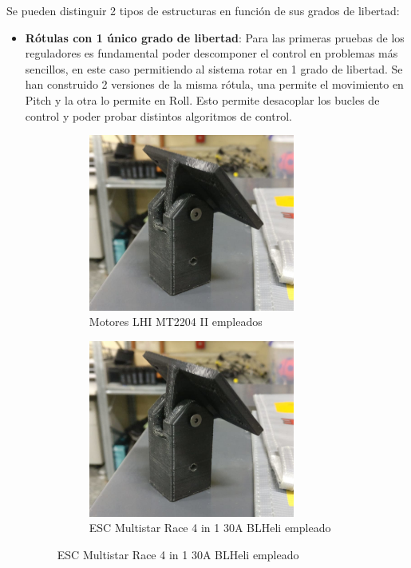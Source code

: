 Se pueden distinguir 2 tipos de estructuras en función de sus grados de libertad:

\begin{itemize}
	\item \textbf{Rótulas con 1 único grado de libertad}: Para las primeras pruebas de los reguladores es fundamental poder descomponer el control en problemas más sencillos, en este caso permitiendo al sistema rotar en 1 grado de libertad. Se han construido 2 versiones de la misma rótula, una permite el movimiento en Pitch y la otra lo permite en Roll. Esto permite desacoplar los bucles de control y poder probar distintos algoritmos de control.
	
	
	\begin{figure}[htb!]
		\centering
		\begin{subfigure}{0.4\textwidth}
			\centering
			\includegraphics[width=0.8\textwidth,height=0.2\textheight]{hardware/rotulaPitch1.jpeg}
			\caption{Motores LHI MT2204 II empleados}
			\label{a}
		\end{subfigure}
		\begin{subfigure}{0.4\textwidth}
			\centering
			\includegraphics[width=0.8\textwidth,height=0.2\textheight]{hardware/rotulaPitch1.jpeg}
			\caption{ESC Multistar Race 4 in 1 30A BLHeli empleado}
			\label{b}
		\end{subfigure}
	\end{figure}


\end{itemize}
